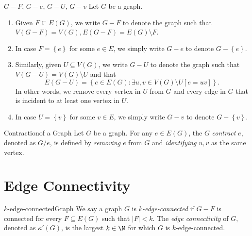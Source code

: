 \documentclass[co342]{subfiles}
\begin{document}
    \begin{notation}{$G-F$, $G-e$, $G-U$, $G-v$}{}
        Let $G$ be a graph. 
        \begin{enumerate}
            \item Given $F\subseteq E\left( G \right)$, we write $G-F$ to denote the graph such that $V\left( G-F \right) = V\left( G \right) , E\left( G-F \right) = E\left( G \right) \setminus F$. 
            \item In case $F=\left\lbrace e \right\rbrace$ for some $e\in E$, we simply write $G-e$ to denote $G-\left\lbrace e \right\rbrace$. 
            \item Similarly, given $U\subseteq V\left( G \right) $, we write $G-U$ to denote the graph such that $V\left( G-U \right) = V\left( G \right) \setminus U$ and that
                \begin{equation*}
                    E\left( G-U \right) = \left\lbrace e\in E\left( G \right) : \exists u,v\in V\left( G \right) \setminus U\left[ e=uv \right]  \right\rbrace .
                \end{equation*}
                In other words, we remove every vertex in $U$ from $G$ and every edge in $G$ that is incident to at least one vertex in $U$.
            \item In case $U=\left\lbrace v \right\rbrace$ for some $v\in E$, we simply write $G-v$ to denote $G-\left\lbrace v \right\rbrace$.
        \end{enumerate}
    \end{notation}

    \begin{definition}{Contraction}{of a Graph}
        Let $G$ be a graph. For any $e\in E\left( G \right)$, the $G$ \emph{contract} $e$, denoted as $G /e$, is defined by \textit{removing} $e$ from $G$ and \textit{identifying} $u,v$ as the same vertex.
    \end{definition}

    \section{Edge Connectivity}
    
    \begin{definition}{$k$-edge-connected}{Graph}
        We say a graph $G$ is \emph{$k$-edge-connected} if $G-F$ is connected for every $F\subseteq E\left( G \right)$ such that $\left| F \right| < k$. The \emph{edge connectivity} of $G$, denoted as $\kappa'\left( G \right)$, is the largest $k\in\N$ for which $G$ is $k$-edge-connected.
    \end{definition}
\end{document}
